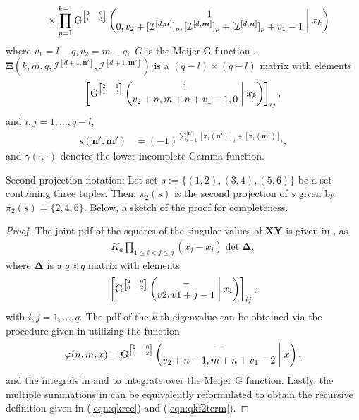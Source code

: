 \begin{theorem}
\begin{align}
			&\qquad \times \prod_{p = 1}^{k-1} \mathrm{G}^{\tiny\begin{bmatrix} 3&0\\1&3 \end{bmatrix}}\left(\begin{matrix} 1 \\ 0, v_2+[{\mathcal{I}}^{[d,\boldsymbol{n}]}]_p, [{\mathcal{I}}^{[d,\boldsymbol{m}]}]_p + [{\mathcal{I}}^{[d,\boldsymbol{n}]}]_p+v_1 - 1 \end{matrix}\;\middle|\;x_k\right)\label{eqn:qkf2term}
		\end{align}
	where $v_1=l-q, v_2=m-q,$ $G$ is the Meijer G function \cite{Olver2010}, $\boldsymbol{\Xi}\left(k, m, q, {\mathcal{I}}^{[d+1,\boldsymbol{n}']},{\mathcal{I}}^{[d+1,\boldsymbol{m}']}\right)$ is a $(q-l)\times (q-l)$ matrix with elements 
	\begin{equation}
		\left[\mathrm{G}^{\tiny\begin{bmatrix} 2&1\\1&3 \end{bmatrix}}\left(\begin{matrix} 1 \\ v_2+n,m+n+v_1-1,0 \end{matrix}\;\middle|\;x_k\right)\right]_{ij}, \label{eqn:qkf2mat}
	\end{equation}
	and $i,j=1,\dots,q-l,$
	\begin{align}
		s\left(\boldsymbol{n}',\boldsymbol{m}'\right) &= (-1)^{\sum_{i=1}^{|\boldsymbol{n}'|} [\pi_1(\boldsymbol{n}')]_i + [\pi_1(\boldsymbol{m}')]_i},
	\end{align}
	and $\gamma(\cdot,\cdot)$ denotes the lower incomplete Gamma function.
\end{theorem}

Second projection notation: Let set $s := \{(1,2), (3,4), (5,6)\}$ be a set containing three tuples. Then, $\pi_2(s)$ is the second projection of $s$ given by $\pi_2(s) = \{2, 4, 6\}.$ Below, a sketch of the proof for completeness.

\begin{proof}
	The joint pdf of the squares of the singular values of $\boldsymbol{X}\boldsymbol{Y}$ is given in \cite[(18)]{Akemann2013},\cite{Ipsen2015} as
	\begin{align}
		K_q \prod_{1\leq i < j \leq q} (x_j-x_i) \det{\boldsymbol{\Delta}},
	\end{align}
	where $\boldsymbol{\Delta}$ is a $q \times q$ matrix with elements
	\begin{equation}
		\left[\mathrm{G}^{\tiny\begin{bmatrix} 2&0\\0&2 \end{bmatrix}}\left(\begin{matrix} - \\ v2,v1+j-1 \end{matrix}\;\middle|\;x_i\right)\right]_{ij},
	\end{equation}
	with $i,j=1,\dots,q.$ The pdf of the $k$-th eigenvalue can be obtained via the procedure given in \cite[Sec. IV-B]{Zanella2009} utilizing the function
	\begin{equation}
		\varphi(n,m,x) = \mathrm{G}^{\tiny\begin{bmatrix} 2&0\\0&2 \end{bmatrix}}\left(\begin{matrix} - \\ v_2+n-1, m+n+v_1-2 \end{matrix}\;\middle|\;x\right),
	\end{equation}
	and the integrals in \cite[(A7)]{Akemann2013} and \cite{Olver2010} to integrate over the Meijer G function. Lastly, the multiple summations in \cite[Sec. IV-B]{Zanella2009} can be equivalently reformulated to obtain the recursive definition given in (\ref{eqn:qkrec}) and (\ref{eqn:qkf2term}).
\end{proof}

